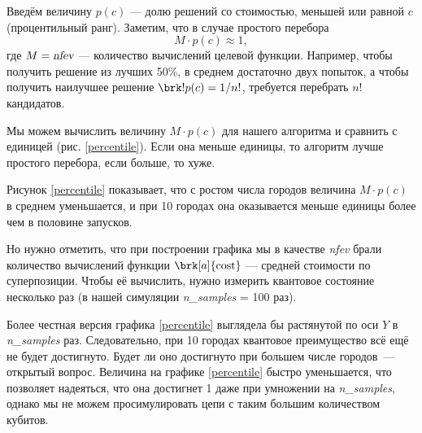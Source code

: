 Введём величину $p(c)$ --- долю решений со стоимостью, меньшей или равной $c$ (процентильный ранг). Заметим, что в случае простого перебора
$$
M \cdot p(c) \approx 1,
$$
где $M = \textsl{nfev}$ --- количество вычислений целевой функции. Например, чтобы получить решение из лучших 50\%, в среднем достаточно двух попыток, а чтобы получить наилучшее решение $\brk!{p(c) = 1/n!}$, требуется перебрать $n!$ кандидатов.

Мы можем вычислить величину $M \cdot p(c)$ для нашего алгоритма и сравнить с единицей (рис. \ref{percentile}). Если она меньше единицы, то алгоритм лучше простого перебора, если больше, то хуже.


Рисунок \ref{percentile} показывает, что с ростом числа городов величина $M \cdot p(c)$ в среднем уменьшается, и при 10 городах она оказывается меньше единицы более чем в половине запусков. 

Но нужно отметить, что при построении графика мы в качестве \textsl{nfev} брали количество вычислений функции $\brk[a]{\text{cost}}$ --- средней стоимости по суперпозиции. Чтобы её вычислить, нужно измерить квантовое состояние несколько раз (в нашей симуляции \textsl{n\_samples} = 100 раз). 

Более честная версия графика \ref{percentile} выглядела бы растянутой по оси $Y$ в \textsl{n\_samples} раз. Следовательно, при 10 городах квантовое преимущество всё ещё не будет достигнуто. Будет ли оно достигнуто при большем числе городов~--- открытый вопрос. Величина на графике \ref{percentile} быстро уменьшается, что позволяет надеяться, что она достигнет 1 даже при умножении на \textsl{n\_samples}, однако мы не можем просимулировать цепи с таким большим количеством кубитов.







\showbib


 
